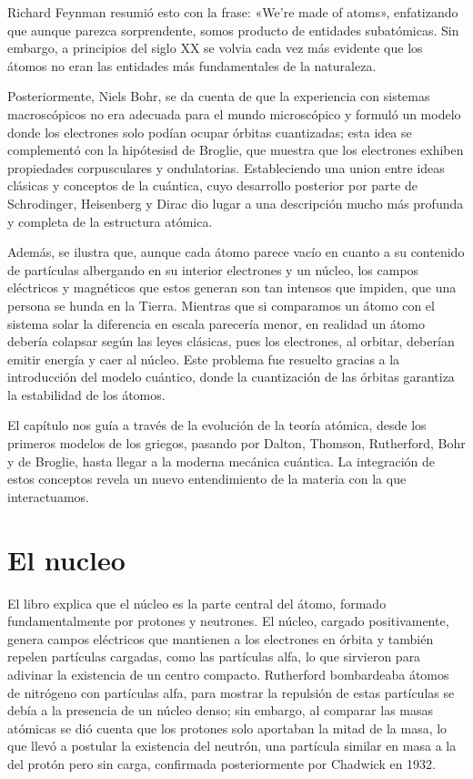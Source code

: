 \documentclass[12pt]{article}
\begin{document}
Richard Feynman resumió esto con la frase: «We’re made of atoms», enfatizando que aunque parezca sorprendente, somos producto de entidades subatómicas. Sin embargo, a principios del siglo XX se volvia cada vez más evidente que los átomos no eran las entidades más fundamentales de la naturaleza.

Posteriormente, Niels Bohr, se da cuenta de que la experiencia con sistemas macroscópicos no era adecuada para el mundo microscópico y formuló un modelo donde los electrones solo podían ocupar órbitas cuantizadas; esta idea se complementó con la hipótesisd de Broglie, que muestra que los electrones exhiben propiedades corpusculares y ondulatorias. Estableciendo una union entre ideas clásicas y conceptos de la cuántica, cuyo desarrollo posterior por parte de Schrodinger, Heisenberg y Dirac dio lugar a una descripción mucho más profunda y completa de la estructura atómica.

Además, se ilustra que, aunque cada átomo parece vacío en cuanto a su contenido de partículas albergando en su interior electrones y un núcleo, los campos eléctricos y magnéticos que estos generan son tan intensos que impiden, que una persona se hunda en la Tierra. Mientras que si comparamos un átomo con el sistema solar la diferencia en escala parecería menor, en realidad un átomo debería colapsar según las leyes clásicas, pues los electrones, al orbitar, deberían emitir energía y caer al núcleo. Este problema fue resuelto gracias a la introducción del modelo cuántico, donde la cuantización de las órbitas garantiza la estabilidad de los átomos.

El capítulo nos guía a través de la evolución de la teoría atómica, desde los primeros modelos de los griegos, pasando por Dalton, Thomson, Rutherford, Bohr y de Broglie, hasta llegar a la moderna mecánica cuántica. La integración de estos conceptos revela un nuevo entendimiento de la materia con la que interactuamos.

\section{El nucleo}
El libro explica que el núcleo es la parte central del átomo, formado fundamentalmente por protones y neutrones. El núcleo, cargado positivamente, genera campos eléctricos que mantienen a los electrones en órbita y también repelen partículas cargadas, como las partículas alfa, lo que sirvieron para adivinar la existencia de un centro compacto. Rutherford bombardeaba átomos de nitrógeno con partículas alfa, para mostrar la repulsión de estas partículas se debía a la presencia de un núcleo denso; sin embargo, al comparar las masas atómicas se dió cuenta que los protones solo aportaban la mitad de la masa, lo que llevó a postular la existencia del neutrón, una partícula similar en masa a la del protón pero sin carga, confirmada posteriormente por Chadwick en 1932.
\end{document}
